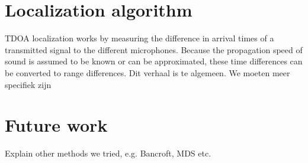 \documentclass[11pt,titlepage]{report}
\begin{document}
\section{Localization algorithm}
\label{sec:loc_alg}
TDOA localization works by measuring the difference in arrival times of a transmitted signal to the different microphones. Because the propagation speed of sound is assumed to be known or can be approximated, these time differences can be converted to range differences. Dit verhaal is te algemeen. We moeten meer specifiek zijn 

\section{Future work}
\label{sec:loc_future}
Explain other methods we tried, e.g. Bancroft, MDS etc.
\end{document}
